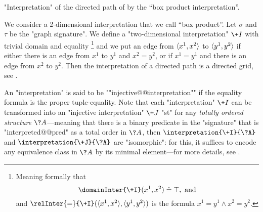 \begin{marginfigure}
	\centering
	\caption{
		\AP\label{fig:interpretation-path-into-grid}
		"Interpretation" of the directed path of
		 by the
		``box product interpretation''.
	}
\end{marginfigure}
\begin{example}
	We consider a 2-dimensional interpretation that we call ``box product''.
	Let $\sigma$ and $\tau$ be the "graph signature".
	We define a "two-dimensional interpretation" $\+I$ with trivial domain and equality%
	\footnote{Meaning formally that \[\domainInter{\+I}(x^1,x^2) \defeq \top,\text{ and}\]
	and $\relInter{=}{\+I}(\tup{x^1,x^2}, \tup{y^1,y^2})$ is
	the formula $x^1 = y^1 \land x^2 = y^2$.}
	and we put an edge from $\langle x^1,x^2\rangle$ to $\langle y^1,y^2\rangle$ if either
	there is an edge from $x^1$ to $y^1$ and $x^2 = y^2$, or if
	$x^1 = y^1$ and there is an edge from $x^2$ to $y^2$.
	Then the interpretation of a directed path is a directed grid,
	see .
\end{example}

An "interpretation" is said to be \AP""injective@@interpretation"" if the equality formula
is the proper tuple-equality.
Note that each "interpretation" $\+I$ can be transformed into
an "injective interpretation" $\+J$ "st" 
for any \emph{totally ordered structure} $\?A$---meaning that there is a binary predicate
in the "signature" that is "interpreted@@pred" as a total order in $\?A$,
then $\interpretation{\+I}{\?A}$ and $\interpretation{\+J}{\?A}$ are "isomorphic":
for this, it suffices to encode any equivalence class in $\?A$ by its minimal element---for more
details, see .

